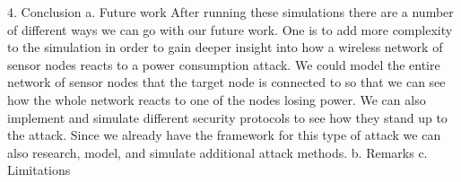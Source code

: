 4. Conclusion
a. Future work
	After running these simulations there are a number of different ways we can go with our future work.  One is to add more complexity to the simulation in order to gain deeper insight into how a wireless network of sensor nodes reacts to a power consumption attack.  We could model the entire network of sensor nodes that the target node is connected to so that we can see how the whole network reacts to one of the nodes losing power. We can also implement and simulate different security protocols to see how they stand up to the attack.  Since we already have the framework for this type of attack we can also research, model, and simulate additional attack methods. 
b. Remarks
c. Limitations